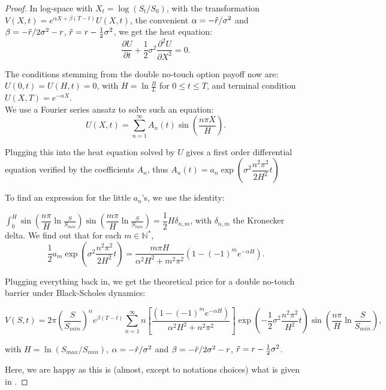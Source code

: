 \begin{appendices}
\begin{proof}
In log-space with $X_t = \log\left(S_t/S_0 \right)$, with the transformation $V(X,t) = e^{\alpha X + \beta (T-t)} U(X,t)$, the convenient $\alpha = -\Tilde{r}/\sigma^2$ and $\beta = -\Tilde{r}/ 2\sigma^2 - r$, $\Tilde{r} = r - \frac{1}{2}\sigma^2$, we get the heat equation:
\[
\dfrac{\partial U}{\partial t} + \dfrac{1}{2} \sigma^2 \dfrac{\partial^2 U}{\partial X^2} = 0.
\]

The conditions stemming from the double no-touch option payoff now are: $U(0,t) = U(H,t) = 0$, with $H=\ln\frac{B}{L}$ for $0 \leq t \leq T$, and terminal condition $U(X,T) = e^{-\alpha X}$.\\

We use a Fourier series ansatz to solve such an equation: $$U(X,t) = \sum_{n=1}^{\infty} A_n(t) \sin \left(\dfrac{n\pi X}{H} \right).$$

Plugging this into the heat equation solved by $U$ gives a first order differential equation verified by the coefficients $A_n$, thus $A_n(t) = a_n \exp \left(\sigma^2 \dfrac{n^2 \pi^2}{2 H^2} t \right)$

To find an expression for the little $a_n$'s, we use the identity: 

$\int_0^H \sin \left(\dfrac{n\pi}{H}\ln \frac{S}{S_{min}}\right) \sin \left(\dfrac{m\pi}{H}\ln \frac{S}{S_{min}}\right) = \dfrac{1}{2}H \delta_{n,m}$, with $\delta_{n,m}$ the Kronecker delta. We find out that for each $m \in \mathbb{N}^{*}$, $$\dfrac{1}{2}a_m \exp \left(\sigma^2 \dfrac{n^2 \pi^2}{2 H^2} t \right) = \dfrac{m \pi H}{\alpha^2 H^2 + m^2 \pi^2} (1 - (-1)^{m}e^{-\alpha H}).$$

Plugging everything back in, we get the theoretical price for a double no-touch barrier under Black-Scholes dynamics:

\[
V(S,t) = 2\pi \left(\dfrac{S}{S_{min}}\right)^{\alpha} e^{\beta(T-t)} \sum_{n=1}^{\infty} n \left[\dfrac{(1 - (-1)^{m}e^{-\alpha H})}{\alpha^2 H^2 + n^2 \pi^2} \right] \exp \left(-\frac{1}{2}\sigma^2 \dfrac{n^2 \pi^2}{H^2} t \right) \sin \left(\dfrac{n\pi}{H} \ln \frac{S}{S_{min}} \right),
\]

with $H=\ln(S_{max}/S_{min})$, $\alpha = -\Tilde{r}/\sigma^2$ and $\beta = -\Tilde{r}/ 2\sigma^2 - r$, $\Tilde{r} = r - \frac{1}{2}\sigma^2$.

Here, we are happy as this is (almost, except to notations choices) what is given in \cite{ebenfeld2002analysis}.

\end{proof}


\end{appendices}
